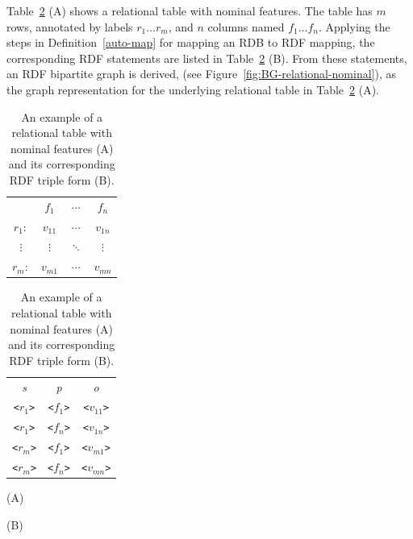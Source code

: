 \begin{myexp}
Table~\ref{tbl:nominal-rel} (A) shows a relational table with nominal features. The table has $m$ rows, annotated by labels $r_1 \ldots r_m$, and $n$ columns named $f_1 \ldots f_n$. Applying the steps in Definition~\ref{auto-map} for mapping an RDB to RDF mapping, the corresponding RDF statements are listed in Table~\ref{tbl:nominal-rel} (B). From these statements, an RDF bipartite graph is derived, (see Figure~\ref{fig:BG-relational-nominal}), as the graph representation for the underlying relational table in Table~\ref{tbl:nominal-rel} (A).
\end{myexp}

\begin{table}[ht]
\begin{minipage}[c]{0.4\linewidth}\begin{flushright}
\begin{tabular}{ c | c | c | c |}
\cline{2-4}
	~   & $f_1$	    & $\cdots$  & $f_n$   \\
\cline{2-4}
$r_1:$	& $v_{11}$	& $\cdots$  & $v_{1n}$\\
\cline{2-4}
$\vdots$& $\vdots$  & $\ddots$  & $\vdots$\\
\cline{2-4}
$r_m:$	& $v_{m1}$	& $\cdots$  & $v_{mn}$\\
\cline{2-4}
\end{tabular}
\end{flushright}
\end{minipage}
\hfill
\begin{minipage}[c]{0.4\linewidth}
\begin{tabular}{c c c}
\emph{s}&   \emph{p}&  \emph{o}\\
\texttt{<$r_1$>}   &  \texttt{<$f_1$>}  &  \texttt{<$v_{11}$>}\\
\texttt{<$r_1$>}   &  \texttt{<$f_n$>}  &  \texttt{<$v_{1n}$>}\\
\texttt{<$r_m$>}   &  \texttt{<$f_1$>}  &  \texttt{<$v_{m1}$>}\\
\texttt{<$r_m$>}   &  \texttt{<$f_n$>}  &  \texttt{<$v_{mn}$>}\\
\end{tabular}
\end{minipage}
\begin{minipage}[c]{0.4\linewidth}\centering
\vspace{0.2cm}\hspace{2.8cm}(A)
\end{minipage}
\begin{minipage}[c]{0.4\linewidth}\centering
\vspace{0.2cm}\hspace{3.5cm}(B)
\end{minipage}
\caption[An example relational table with nominal features and the corresponding RDF]{\label{tbl:nominal-rel} An example of a relational table with nominal features (A) and its corresponding RDF triple form (B).}
\end{table}

